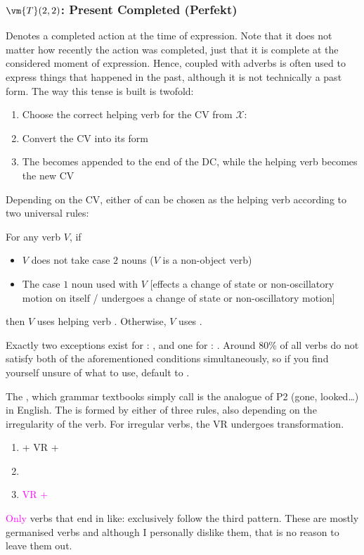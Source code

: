 \subsubsection{$\vm{T}(2,2)$: Present Completed (Perfekt)}
Denotes a completed action at the time of expression. Note that it does not matter how recently the action was completed, just that it is complete at the considered  moment of expression. Hence,  coupled with adverbs is often  used to express things that happened in the past, although it is not technically a past form. The way this tense is built is twofold:
\begin{enumerate}
    \item Choose the correct  helping verb for the CV from $\mathcal{X}$: 
    \item Convert the CV into its  form
    \item The  becomes appended to the end of the DC, while the helping verb becomes the new CV
\end{enumerate}
Depending on the CV, either of  can be chosen as the helping verb according to two universal rules:
\begin{syntax}
    For any verb $V$, if
    \begin{itemize}
        \item $V$ does not take case $2$ nouns ($V$ is a non-object verb) 
        \item The case $1$ noun used with $V$ [effects a change of state or non-oscillatory motion on itself / undergoes a change of state or non-oscillatory motion]
    \end{itemize}
    then $V$ uses helping verb . Otherwise, $V$  uses .
\end{syntax}
Exactly two exceptions exist for : , and one for : .  Around 80\% of all verbs do not satisfy both of the aforementioned conditions simultaneously, so if you find yourself  unsure of what to use, default to .

The , which  grammar textbooks simply call  is the analogue of P2 (gone, looked\ldots) in English. The  is formed by either of three rules, also depending on the irregularity of the verb. For irregular verbs, the VR undergoes transformation.
\begin{enumerate}
    \item {} + VR + 
    \item {}
    \item \textcolor{magenta}{VR + }
\end{enumerate}
\textcolor{magenta}{Only} verbs that end in  like:  exclusively follow the third pattern. These are mostly germanised verbs and although I personally dislike them, that is no reason to leave them out.

